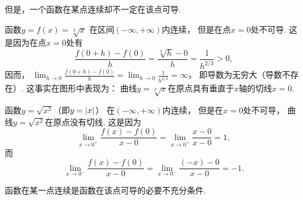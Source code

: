 但是，一个函数在某点连续却不一定在该点可导.
\begin{example}
函数\(y=f(x)=\sqrt[3]x\)
在区间\((-\infty,+\infty)\)内连续，
但是在点\(x=0\)处不可导.
这是因为在点\(x=0\)处有\[
	\frac{f(0+h)-f(0)}{h}
	=\frac{\sqrt[3]{h}-0}{h}
	=\frac{1}{h^{2/3}}>0,
\]
因而，
\(\lim_{h\to0} \frac{f(0+h)-f(0)}{h}
=\lim_{h\to0} \frac{1}{h^{2/3}}
=\infty\)，
即导数为无穷大（导数不存在）.
这事实在图形中表现为：
曲线\(y=\sqrt[3]x\)在原点具有垂直于\(x\)轴的切线\(x=0\).
\end{example}

\begin{example}
函数\(y=\sqrt{x^2}\)（即\(y=\abs{x}\)）
在\((-\infty,+\infty)\)内连续，
但是在\(x=0\)处不可导，
曲线\(y=\sqrt{x^2}\)在原点没有切线.
这是因为\[
	\lim_{x\to0^+} \frac{f(x)-f(0)}{x-0}
	= \lim_{x\to0^+} \frac{x-0}{x-0}
	= 1,
\]
而\[
	\lim_{x\to0^-} \frac{f(x)-f(0)}{x-0}
	= \lim_{x\to0^-} \frac{(-x)-0}{x-0}
	= -1.
\]
\end{example}

\begin{remark}
函数在某一点连续是函数在该点可导的必要不充分条件.
\end{remark}

